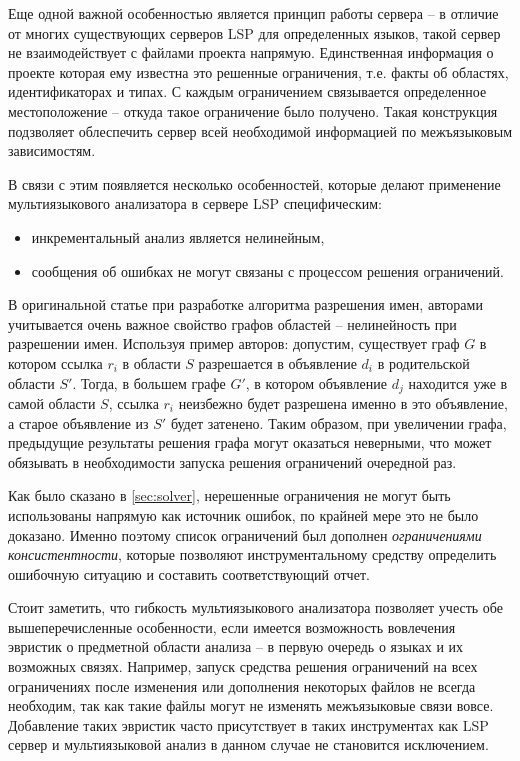 Еще одной важной особенностью является принцип работы сервера -- в отличие от многих существующих серверов LSP для
определенных языков, такой сервер не взаимодействует с файлами проекта напрямую. Единственная информация о проекте
которая ему известна это решенные ограничения, т.е. факты об областях, идентификаторах и типах. С каждым ограничением
связывается определенное местоположение -- откуда такое ограничение было получено. Такая конструкция подзволяет
облеспечить сервер всей необходимой информацией по межъязыковым зависимостям.

В связи с этим появляется несколько особенностей, которые делают применение мультиязыкового анализатора в сервере LSP
специфическим:
\begin{itemize}
    \item инкрементальный анализ является нелинейным,
    \item сообщения об ошибках не могут связаны с процессом решения ограничений.
\end{itemize}

В оригинальной статье \cite{scope-graphs-static-analysis} при разработке алгоритма разрешения имен, авторами
учитывается очень важное свойство графов областей -- нелинейность при разрешении имен. Используя пример авторов:
допустим, существует граф $G$ в котором ссылка $r_i$ в области $S$ разрешается в объявление $d_i$ в родительской области $S'$.
Тогда, в большем графе $G'$, в котором объявление $d_j$ находится уже в самой области $S$, ссылка $r_i$ неизбежно
будет разрешена именно в это объявление, а старое объявление из $S'$ будет затенено.
Таким образом, при увеличении графа, предыдущие результаты решения графа могут оказаться неверными, что
может обязывать в необходимости запуска решения ограничений очередной раз.

Как было сказано в \ref{sec:solver}, нерешенные ограничения не могут быть использованы напрямую как источник
ошибок, по крайней мере это не было доказано. Именно поэтому список ограничений был дополнен \textit{ограничениями консистентности},
которые позволяют инструментальному средству определить ошибочную ситуацию и составить соответствующий отчет.

Стоит заметить, что гибкость мультиязыкового анализатора позволяет учесть обе вышеперечисленные особенности,
если имеется возможность вовлечения эвристик о предметной области анализа -- в первую очередь о языках и
их возможных связях. Например, запуск средства решения ограничений на всех ограничениях после изменения или дополнения некоторых файлов не всегда
необходим, так как такие файлы могут не изменять межъязыковые связи вовсе. Добавление таких эвристик
часто присутствует в таких инструментах как LSP сервер и мультиязыковой анализ в данном случае не становится исключением.

